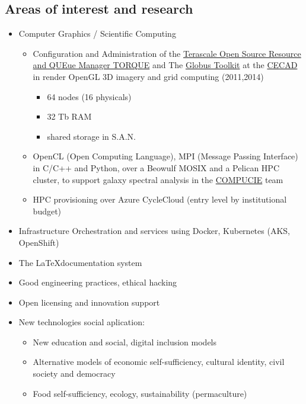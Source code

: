 \documentclass[overlapped,line,final]{res}
\begin{document}
\begin{resume}
\section{\sc Areas of interest and research}
\vspace{0.5cm}
\begin{itemize}
	\item Computer Graphics / Scientific Computing
	\begin{itemize}
		\item Configuration and Administration of the \href {https://github.com/adaptivecomputing/torque}{Terascale Open Source Resource and QUEue Manager TORQUE} and The \href{https://toolkit.globus.org/}{Globus Toolkit} at the \href{https://cecad.udistrital.edu.co/}{CECAD} in render OpenGL 3D imagery and grid computing (2011,2014)
	 \begin{itemize}
	  \item 64 nodes (16 physicals)
	  \item 32 Tb RAM
	  \item shared storage in S.A.N.
	 \end{itemize}
 \item OpenCL (Open Computing Language), MPI (Message Passing Interface) in C\slash C++ and Python, over a Beowulf MOSIX and a Pelican HPC cluster, to support galaxy spectral analysis in the \href{http://chronos.udistrital.edu.co:8095/siciud/web/Consultas.x?accion=5&idSemillero=2382}{COMPUCIE} team 
	 \item HPC provisioning over Azure CycleCloud (entry level by institutional budget)
	\end{itemize}
	\item Infrastructure Orchestration and services using Docker, Kubernetes (AKS, OpenShift)
	\item The \LaTeX documentation system	
    \item Good engineering practices, ethical hacking
	\item Open licensing and innovation support
    \item New technologies social aplication:
    \begin{itemize}
		\item New education and social, digital inclusion models
	    \item Alternative models of economic self-sufficiency, cultural identity, civil society and democracy
	    \item Food self-sufficiency, ecology, sustainability (permaculture)
    \end{itemize}


\end{itemize}
\end{resume}
\end{document}
